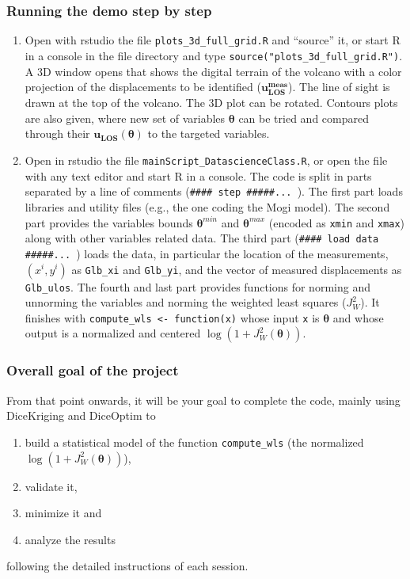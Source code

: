 \documentclass[12pt]{article}
\newcommand{\enm}[1]{\ensuremath{#1}\xspace}
\newcommand{\vect}[1]{\enm{\boldsymbol{\mathbf{#1}}}}
\begin{document}
\subsubsection{Running the demo step by step}
\begin{enumerate}
\item Open with rstudio the file \texttt{plots\_3d\_full\_grid.R} and ``source'' it, or start R in a console in the file directory and type
\texttt{source("plots\_3d\_full\_grid.R")}. 
A 3D window opens that shows the digital terrain of the volcano with a color projection of the displacements to be identified ($\vect{u_{LOS}^\text{meas}}$). The line of sight is drawn at the top of the volcano. The 3D plot can be rotated. 
Contours plots are also given, where new set of variables \vect{\theta} can be tried and compared through their $\vect{u_{LOS}(\vect{\theta})}$ to the targeted variables.
\item Open in rstudio the file \texttt{mainScript\_DatascienceClass.R}, or open the file with any text editor and start R in a console. 
The code is split in parts separated by a line of comments (\verb=#### step #####... =).
The first part loads libraries and utility files (e.g., the one coding the Mogi model).
The second part provides the variables bounds $\vect{\theta}^{min}$ and $\vect{\theta}^{max}$ (encoded as \texttt{xmin} and \texttt{xmax}) along with other variables related data.
The third part (\verb=#### load data #####... =) loads the data, in particular the location of the measurements, $(x^i,y^i)$ as \texttt{Glb\_xi} and \texttt{Glb\_yi}, and the vector of measured displacements as \texttt{Glb\_ulos}.
The fourth and last part provides functions for norming and unnorming the variables and norming the weighted least squares ($J^2_W$). It finishes with \texttt{compute\_wls <- function(x)} whose input \texttt{x} is \vect{\theta} and whose output is a normalized and centered $\log(1 + J^2_W(\vect{\theta}))$.
\end{enumerate}

\subsubsection{Overall goal of the project}
From that point onwards, it will be your goal to complete the code, mainly using DiceKriging and DiceOptim to 
\begin{enumerate}
\item build a statistical model of the function \texttt{compute\_wls} (the normalized $\log(1 + J^2_W(\vect{\theta}))$),
\item validate it,
\item minimize it and
\item analyze the results
\end{enumerate}
following the detailed instructions of each session.
\end{document}
